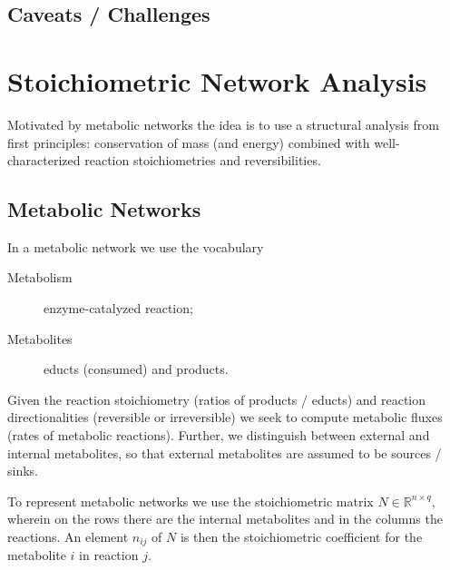 \documentclass[a4paper]{article}
\theoremstyle{plain}
\theoremstyle{definition}
\theoremstyle{remark}
\begin{document}
\subsection{Caveats / Challenges}


\section{Stoichiometric Network Analysis}

Motivated by metabolic networks the idea is to use a structural analysis from
first principles: conservation of mass (and energy) combined with
well-characterized reaction stoichiometries and reversibilities.


\subsection{Metabolic Networks}

In a metabolic network we use the vocabulary
\begin{description}
  \item[Metabolism] enzyme-catalyzed reaction;
  \item[Metabolites] educts (consumed) and products.
\end{description}
Given the reaction stoichiometry (ratios of products / educts) and reaction
directionalities (reversible or irreversible) we seek to compute metabolic
fluxes (rates of metabolic reactions). Further, we distinguish between
external and internal metabolites, so that external metabolites are assumed to
be sources / sinks.

To represent metabolic networks we use the stoichiometric matrix $N \in
\mathbb{R}^{n \times q}$, wherein on the rows there are the internal
metabolites and in the columns the reactions. An element $n_{ij}$ of $N$ is
then the stoichiometric coefficient for the metabolite $i$ in reaction $j$. 
\end{document}
